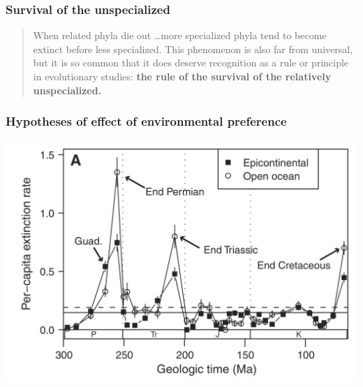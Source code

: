 \documentclass{beamer}
\begin{document}
\begin{frame}
  \frametitle{Survival of the unspecialized}
  \begin{quote}
    When related phyla die out \dots more specialized phyla tend to become extinct before less specialized. This phenomenon is also far from universal, but it is so common that it does deserve recognition as a rule or principle in evolutionary studies: \textbf{the rule of the survival of the relatively unspecialized.}

  \end{quote}
\end{frame}

\begin{frame}
  \frametitle{Hypotheses of effect of environmental preference}
  \includegraphics[width = \textwidth,height = 0.8\textheight,keepaspectratio = true]{figure/miller_foote}

\end{frame}
\end{document}
